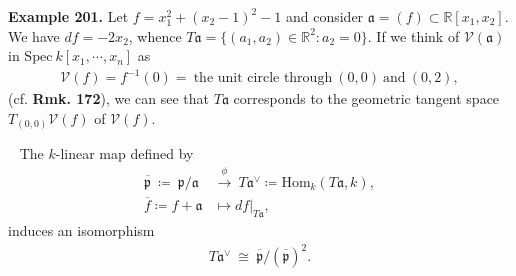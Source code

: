 \documentclass[12pt,a4paper,footinclude=true,headinclude=true]{scrbook} %
\newenvironment{proposition}[2][]
{\renewcommand\theinnercustomprop{#2}\innercustomprop[#1] 
\begin{mdframed}[backgroundcolor=gray!20]\ }
{\end{mdframed}\endinnercustomprop}
\newenvironment{example}[2][Example]
    { \begin{mdframed}[backgroundcolor=gray!20] \textbf{#1 #2.} }
    {  \end{mdframed}}
\begin{document}
\begin{example}{201}
    Let $f=x_1^2+(x_2-1)^2-1$ and consider $\mathfrak{a}=(f)\subset\mathbb{R}[x_1,x_2]$. We have $df=-2x_2$, whence $T\mathfrak{a}=\{(a_1,a_2)\in\mathbb{R}^2:a_2=0\}$. If we think of $\mathcal{V}(\mathfrak{a})$ in $\mathrm{Spec}\ k[x_1,\cdots,x_n]$ as
    \begin{align*}
        \mathcal{V}(f)=f^{-1}(0)=\ \text{the unit circle through}\ (0,0)\ \text{and}\ (0,2),
    \end{align*}
    (cf. \textbf{Rmk. 172}), we can see that $T\mathfrak{a}$ corresponds to the geometric tangent space $T_{(0,0)}\mathcal{V}(f)$ of $\mathcal{V}(f)$.
\end{example}

\begin{proposition}{202}
    The $k$-linear map defined by
    \begin{align*}
        \overline{\mathfrak{p}}\ \coloneqq\ \mathfrak{p}/\mathfrak{a}\  &\xrightarrow{~\phi~}\  T\mathfrak{a}^\vee\coloneqq\mathrm{Hom}_k(T\mathfrak{a},k),\\ \overline{f}\coloneqq f+\mathfrak{a} &\longmapsto df|_{T\mathfrak{a}},
    \end{align*}
    induces an isomorphism
    \begin{align*}
        T\mathfrak{a}^\vee\ \cong\ \overline{\mathfrak{p}}/(\overline{\mathfrak{p}})^2.
    \end{align*}
\end{proposition}
\end{document}
